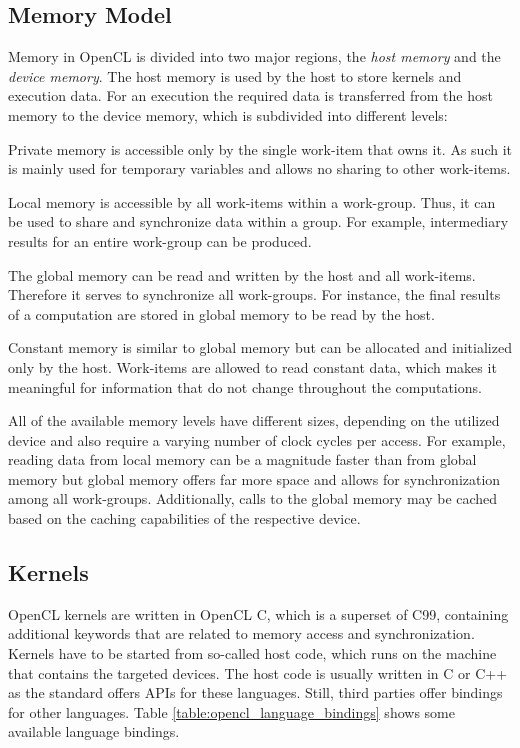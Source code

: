 \subsection*{Memory Model}

Memory in OpenCL is divided into two major regions, the \textit{host memory} and the \textit{device memory}. The host memory is used by the host to store kernels and execution data. For an execution the required data is transferred from the host memory to the device memory, which is subdivided into different levels:

\begin{description}[align=left,leftmargin=0cm]
  \item [Private] Private memory is accessible only by the single work-item that owns it. As such it is mainly used for temporary variables and allows no sharing to other work-items.
  \item [Local] Local memory is accessible by all work-items within a work-group. Thus, it can be used to share and synchronize data within a group. For example, intermediary results for an entire work-group can be produced.
  \item [Global] The global memory can be read and written by the host and all work-items. Therefore it serves to synchronize all work-groups. For instance, the final results of a computation are stored in global memory to be read by the host.
  \item [Constant] Constant memory is similar to global memory but can be allocated and initialized only by the host. Work-items are allowed to read constant data, which makes it meaningful for information that do not change throughout the computations.
\end{description}

All of the available memory levels have different sizes, depending on the utilized device and also require a varying number of clock cycles per access. For example, reading data from local memory can be a magnitude faster than from global memory but global memory offers far more space and allows for synchronization among all work-groups. Additionally, calls to the global memory may be cached based on the caching capabilities of the respective device.

\subsection*{Kernels}

OpenCL kernels are written in OpenCL C, which is a superset of C99, containing additional keywords that are related to memory access and synchronization. Kernels have to be started from so-called host code, which runs on the machine that contains the targeted devices. The host code is usually written in C or C++ as the standard offers APIs for these languages. Still, third parties offer bindings for other languages. Table \ref{table:opencl_language_bindings} shows some available language bindings.

